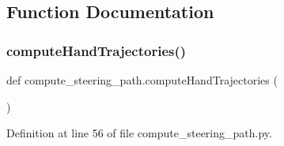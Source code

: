 \subsection{Function Documentation}
\mbox{\label{namespacecompute__steering__path_a7b5761807cb6896d26a326000e13efdc}} 
\subsubsection{\texorpdfstring{computeHandTrajectories()}{computeHandTrajectories()}}
{\footnotesize\ttfamily def compute\+\_\+steering\+\_\+path.\+compute\+Hand\+Trajectories (\begin{DoxyParamCaption}{ }\end{DoxyParamCaption})}



Definition at line 56 of file compute\+\_\+steering\+\_\+path.\+py.


